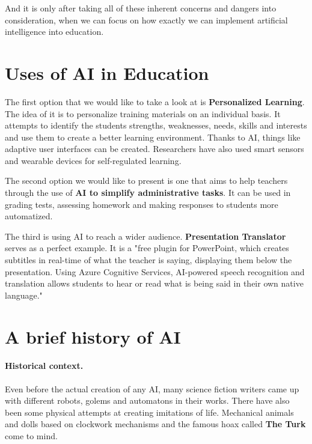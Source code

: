 \documentclass[10pt,a4paper,]{article}
\begin{document}
And it is only after taking all of these inherent concerns and dangers into consideration, when we can focus on how exactly we can implement artificial intelligence into education.

\section{Uses of AI in Education} \label{uses}

The first option that we would like to take a look at is \textbf{Personalized Learning}. The idea of it is to personalize training materials on an individual basis. It attempts to identify the students strengths, weaknesses, needs, skills and interests and use them to create a better learning environment. Thanks to AI, things like adaptive user interfaces can be created\cite{Jiming2003}. Researchers have also used smart sensors and wearable devices for self-regulated learning\cite{Ciolacu2018}.

The second option we would like to present is one that aims to help teachers through the use of \textbf{AI to simplify administrative tasks}. It can be used in grading tests, assessing homework\cite{LLAMASNISTAL2013} and making responses to students more automatized\cite{Park2019}.

The third is using AI to reach a wider audience. \textbf{Presentation Translator} serves as a perfect example. It is a "free plugin for PowerPoint, which creates subtitles in real-time of what the teacher is saying, displaying them below the presentation. Using Azure Cognitive Services, AI-powered speech recognition and translation allows students to hear or read what is being said in their own native language."\cite{McNeill2018}

\section{A brief history of AI} \label{history}

\paragraph{Historical context.}

Even before the actual creation of any AI, many science fiction writers came up with different robots, golems and automatons in their works. There have also been some physical attempts at creating imitations of life. Mechanical animals and dolls based on clockwork mechanisms and the famous hoax called \textbf{The Turk} come to mind.\cite{Buchanan2005}
\end{document}
